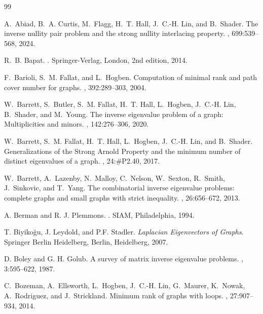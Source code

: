 \documentclass{article}
\theoremstyle{definition}
\begin{document}
\begin{thebibliography}{99}

A.~Abiad, B.~A. Curtis, M.~Flagg, H.~T. Hall, J.~C.-H. Lin, and B.~Shader.
\newblock The inverse nullity pair problem and the strong nullity interlacing
  property.
, 699:539--568, 2024.

R.~B. Bapat.
.
\newblock Springer-Verlag, London, 2nd edition, 2014.

F.~Barioli, S.~M. Fallat, and L.~Hogben.
\newblock Computation of minimal rank and path cover number for graphs.
, 392:289--303, 2004.

W.~Barrett, S.~Butler, S.~M. Fallat, H.~T. Hall, L.~Hogben, J.~C.-H. Lin,
  B.~Shader, and M.~Young.
\newblock The inverse eigenvalue problem of a graph: {M}ultiplicities and
  minors.
, 142:276--306, 2020.

W.~Barrett, S.~M. Fallat, H.~T. Hall, L.~Hogben, J.~C.-H. Lin, and B.~Shader.
\newblock Generalizations of the {S}trong {A}rnold {P}roperty and the minimum
  number of distinct eigenvalues of a graph.
, 24:\#P2.40, 2017.

W.~Barrett, A.~Lazenby, N.~Malloy, C.~Nelson, W.~Sexton, R.~Smith, J.~Sinkovic,
  and T.~Yang.
\newblock The combinatorial inverse eigenvalue problems: complete graphs and
  small graphs with strict inequality.
, 26:656--672, 2013.

A. Berman and R. J. Plemmons.
.
\newblock SIAM, Philadelphia, 1994.

T. Biyikoğu, J. Leydold, and P.F. Stadler.
\newblock \emph{Laplacian Eigenvectors of Graphs}.
\newblock Springer Berlin Heidelberg, Berlin, Heidelberg, 2007. 

D. Boley and G. H. Golub.  
\newblock A survey of matrix inverse eigenvalue problems.
, 3:595--622, 1987.

C.~Bozeman, A.~Ellsworth, L.~Hogben, J.~C.-H. Lin, G.~Maurer, K.~Nowak,
  A.~Rodriguez, and J.~Strickland.
\newblock Minimum rank of graphs with loops.
, 27:907--934, 2014.


\end{thebibliography}
\end{document}
